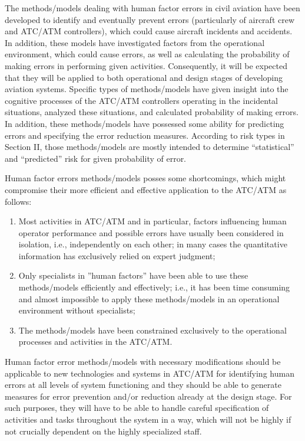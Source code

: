 \documentclass[a4paper, 10pt]{article}
\begin{document}
\begin{enumerate}
The methods/models dealing with human factor errors in
civil aviation have been developed to identify and eventually
prevent errors (particularly of aircraft crew and ATC/ATM
controllers), which could cause aircraft incidents and accidents.
In addition, these models have investigated factors from the
operational environment, which could cause errors, as well as
calculating the probability of making errors in performing
given activities. Consequently, it will be expected that they will
be applied to both operational and design stages of developing
aviation systems. Specific types of methods/models have given
insight into the cognitive processes of the ATC/ATM
controllers operating in the incidental situations, analyzed these
situations, and calculated probability of making errors. In
addition, these methods/models have possessed some ability
for predicting errors and specifying the error reduction
measures. According to risk types in Section II, those
methods/models are mostly intended to determine “statistical”
and “predicted” risk for given probability of error.\par

Human factor errors methods/models posses some
shortcomings, which might compromise their more efficient
and effective application to the ATC/ATM as follows:
\begin{enumerate}
		\item Most activities in ATC/ATM and in particular, factors
influencing human operator performance and possible errors
have usually been considered in isolation, i.e., independently
on each other; in many cases the quantitative information has
exclusively relied on expert judgment;
\item Only specialists in ”human factors” have been able to
use these methods/models efficiently and effectively; i.e., it has
been time consuming and almost impossible to apply these
methods/models in an operational environment without
specialists;
\item The methods/models have been constrained exclusively
to the operational processes and activities in the ATC/ATM.
\end{enumerate}\par

Human factor error methods/models with necessary
modifications should be applicable to new technologies and
systems in ATC/ATM for identifying human errors at all levels
of system functioning and they should be able to generate
measures for error prevention and/or reduction already at the
design stage. For such purposes, they will have to be able to
handle careful specification of activities and tasks throughout
the system in a way, which will not be highly if not crucially
dependent on the highly specialized staff.


\end{enumerate}
\end{document}
